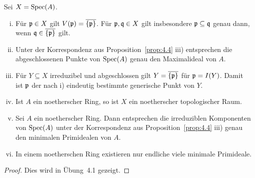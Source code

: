 \begin{prop}
	Sei $X = \operatorname{Spec}(A)$.
	\begin{enumerate}[i)]
		\item Für $\mathfrak{p} \in X$ gilt $V(\mathfrak{p}) = \overline{\{\mathfrak{p}\}}$. Für $\mathfrak{p}, \mathfrak{q} \in X$ gilt insbesondere $\mathfrak{p} \subseteq \mathfrak{q}$ genau dann, wenn $\mathfrak{q} \in \overline{\{\mathfrak{p}\}}$ gilt.
		\item Unter der Korrespondenz aus Proposition~\ref{prop:4.4} iii) entsprechen die abgeschlossenen Punkte von $\operatorname{Spec}(A)$ genau den Maximalideal von $A$.
		\item Für $Y \subseteq X$ irreduzibel und abgeschlossen gilt $Y = \overline{\{\mathfrak{p}\}}$ für $\mathfrak{p} = I(Y)$. Damit ist $\mathfrak{p}$ der nach i) eindeutig bestimmte generische Punkt von $Y$.
		\item Ist $A$ ein noetherscher Ring, so ist $X$ ein noetherscher topologischer Raum.
		\item Sei $A$ ein noetherscher Ring. Dann entsprechen die irreduziblen Komponenten von $\operatorname{Spec}(A)$ unter der Korrespondenz aus Proposition~\ref{prop:4.4} iii) genau den minimalen Primidealen von $A$.
		\item In einem noetherschen Ring existieren nur endliche viele minimale Primideale.
	\end{enumerate}
	\begin{proof}
		Dies wird in Übung~4.1 gezeigt.
	\end{proof}
\end{prop}

